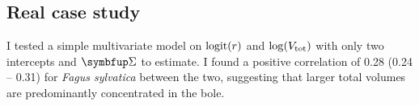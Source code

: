 \subsection{Real case study}

I tested a simple multivariate model on \( \operatorname{logit}(r) \) and \( \log(V_{\text{tot}}) \) with only two intercepts and \( \Sigmabf \) to estimate. I found a positive correlation of 0.28 (0.24 -- 0.31) for \textit{Fagus sylvatica} between the two, suggesting that larger total volumes are predominantly concentrated in the bole.
